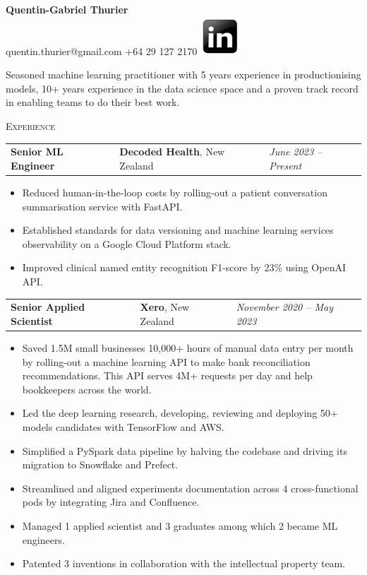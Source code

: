 \documentclass[letterpaper,11pt]{article}
\renewcommand{\section}[1]{{\vspace{0.3cm}}{\scshape\color{blue}#1}{\color{blue}\hrulefill}{\vspace{0.2cm}}}
\newcommand{\resumeItemListStart}{\begin{itemize}[label=$\circ$, topsep=0.1cm, parsep=0cm, partopsep=0cm, itemsep=0.1cm, leftmargin=0.4cm]}
\newcommand{\resumeItem}[1]{\item\small{#1}}
\newcommand{\resumeJustifiedItem}[1]{\item\begin{justify}\small{#1}\end{justify}}
\newcommand{\resumeItemListEnd}{\end{itemize}}
\newcommand{\job}[4]{
    \begin{tabular}{p{7cm}p{6cm}p{5cm}}
      \hspace{-0.7em} \textbf{#1} & \textbf{\small{#2}}\scriptsize{, #3} & \hfill \textit{\small{#4}}
    \end{tabular}
}
\begin{document}
 

\begin{center}
  \textbf{\Large Quentin-Gabriel Thurier} \\
  \small{quentin.thurier@gmail.com} \textbar{}
  \small{+64 29 127 2170} \textbar{}
  \href{https://www.linkedin.com/in/quentin-gabriel-thurier-36586021/}{\includegraphics[scale=0.6,valign=b]{linkedin}} %
\end{center}

\begin{justify}
  Seasoned machine learning practitioner with 5 years experience in productionising models, 10+ years experience in the data science space and a proven track record in enabling teams to do their best work.
\end{justify}

\vspace{-0.2cm}

\section{Experience}

\job {Senior ML Engineer}{Decoded Health}{New Zealand}{June 2023 -- Present}
\resumeItemListStart
\resumeItem {Reduced human-in-the-loop costs by rolling-out a patient conversation summarisation service with FastAPI.}
\resumeItem {Established standards for data versioning and machine learning services observability on a Google Cloud Platform stack.}
\resumeItem {Improved clinical named entity recognition F1-score by 23\% using OpenAI API.}
\resumeItemListEnd \vspace{0.2cm}

\job {Senior Applied Scientist}{Xero}{New Zealand}{November 2020 -- May 2023}
\resumeItemListStart
\resumeJustifiedItem {Saved 1.5M small businesses 10,000+ hours of manual data entry per month by rolling-out a machine learning API to make bank reconciliation recommendations. This API serves 4M+ requests per day and help bookkeepers across the world.}
\resumeJustifiedItem {Led the deep learning research, developing, reviewing and deploying 50+ models candidates with TensorFlow and AWS.}
\resumeItem {Simplified a PySpark data pipeline by halving the codebase and driving its migration to Snowflake and Prefect.}
\resumeItem {Streamlined and aligned experiments documentation across 4 cross-functional pods by integrating Jira and Confluence.}
\resumeItem {Managed 1 applied scientist and 3 graduates among which 2 became ML engineers.}
\resumeItem {Patented 3 inventions in collaboration with the intellectual property team.}
\resumeItemListEnd \vspace{0.2cm}
\end{document}
